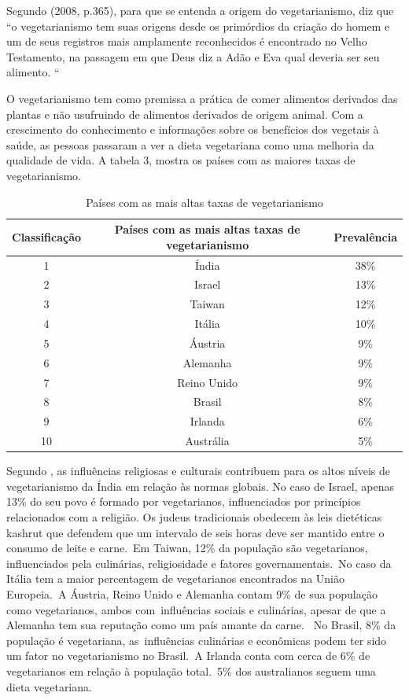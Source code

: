 Segundo \citeauthor{couceiro2008}(2008, p.365), para que se entenda a origem do vegetarianismo, diz que “o vegetarianismo tem suas origens desde os primórdios da criação do homem e um de seus registros mais amplamente reconhecidos é encontrado no Velho Testamento, na passagem em que Deus diz a Adão e Eva qual deveria ser seu alimento. “

O vegetarianismo tem como premissa a prática de comer alimentos derivados das plantas e não usufruindo de alimentos derivados de origem animal. Com a crescimento do conhecimento e informações sobre os benefícios dos vegetais à saúde, as pessoas passaram a ver a dieta vegetariana como uma melhoria da qualidade de vida. A tabela 3, mostra os países com as maiores taxas de vegetarianismo.


\begin{table}[H]
	\centering
	\caption{Países com as mais altas taxas de vegetarianismo}
	\label{paises-com-as-mais-altas-taxas-de-vegetarianimos}
	\begin{tabular}{|c|c|c|}
	\hline
	\textbf{Classificação} & \textbf{Países com as mais altas taxas de vegetarianismo} & \textbf{Prevalência} \\ \hline
	1  & Índia & 38\% \\ \hline
	2  & Israel & 13\% \\ \hline
	3  & Taiwan & 12\% \\ \hline
	4  & Itália & 10\% \\ \hline
	5  & Áustria & 9\% \\ \hline
	6  & Alemanha & 9\% \\ \hline
	7  & Reino Unido & 9\% \\ \hline
	8  & Brasil & 8\% \\ \hline
	9  & Irlanda & 6\% \\ \hline
	10 & Austrália & 5\% \\ \hline
	\end{tabular}
\end{table}

Segundo \citeauthor{worldatlas2017}, as influências religiosas e culturais contribuem para os altos níveis de vegetarianismo da Índia em relação às normas globais. No caso de Israel, apenas 13\% do seu povo é formado por vegetarianos, influenciados por princípios relacionados com a religião. Os judeus tradicionais obedecem às leis dietéticas kashrut que defendem que um intervalo de seis horas deve ser mantido entre o consumo de leite e carne. Em Taiwan, 12\% da população são vegetarianos, influenciados pela culinárias, religiosidade e fatores governamentais. No caso da Itália tem a maior percentagem de vegetarianos encontrados na União Europeia. A Áustria, Reino Unido e Alemanha contam 9\% de sua população como vegetarianos, ambos com influências sociais e culinárias, apesar de que a Alemanha tem sua reputação como um país amante da carne.  No Brasil, 8\% da população é vegetariana, as influências culinárias e econômicas podem ter sido um fator no vegetarianismo no Brasil. A Irlanda conta com cerca de 6\% de vegetarianos em relação à população total. 5\% dos australianos seguem uma dieta vegetariana.

